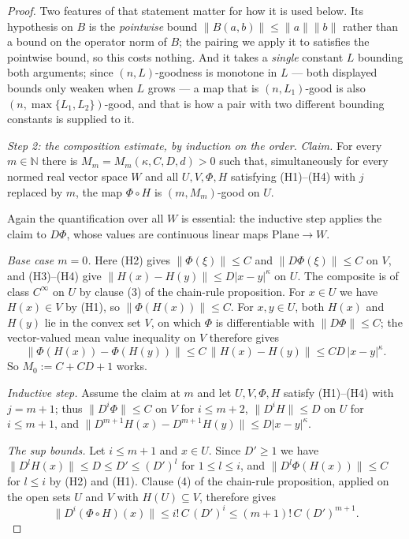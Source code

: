 \begin{proof}
Two features of that statement matter for how it is used below.  Its hypothesis on $B$ is the
\emph{pointwise} bound $\lVert B(a,b)\rVert\le\lVert a\rVert\lVert b\rVert$ rather than a bound
on the operator norm of $B$; the pairing we apply it to satisfies the pointwise bound, so this
costs nothing.  And it takes a \emph{single} constant $L$ bounding both arguments; since
$(n,L)$-goodness is monotone in $L$ --- both displayed bounds only weaken when $L$ grows --- a
map that is $(n,L_1)$-good is also $(n,\max\{L_1,L_2\})$-good, and that is how a pair with two
different bounding constants is supplied to it.

\medskip\noindent\emph{Step 2: the composition estimate, by induction on the order.}
\emph{Claim.}  For every $m\in\mathbb{N}$ there is $M_m=M_m(\kappa,C,D,d)>0$ such that,
simultaneously for every normed real vector space $W$ and all $U,V,\Phi,H$ satisfying
(H1)--(H4) with $j$ replaced by $m$, the map $\Phi\circ H$ is $(m,M_m)$-good on $U$.

Again the quantification over all $W$ is essential: the inductive step applies the claim to
$D\Phi$, whose values are continuous linear maps $\mathrm{Plane}\to W$.

\emph{Base case $m=0$.}  Here (H2) gives $\lVert\Phi(\xi)\rVert\le C$ and
$\lVert D\Phi(\xi)\rVert\le C$ on $V$, and (H3)--(H4) give
$\lVert H(x)-H(y)\rVert\le D\lvert x-y\rvert^{\kappa}$ on $U$.  The composite is of class
$C^{\infty}$ on $U$ by clause (3) of the chain-rule proposition.  For $x\in U$ we have
$H(x)\in V$ by (H1), so $\lVert\Phi(H(x))\rVert\le C$.  For $x,y\in U$, both $H(x)$ and $H(y)$
lie in the convex set $V$, on which $\Phi$ is differentiable with
$\lVert D\Phi\rVert\le C$; the vector-valued mean value inequality on $V$ therefore gives
\[
  \bigl\lVert\Phi(H(x))-\Phi(H(y))\bigr\rVert\le C\,\lVert H(x)-H(y)\rVert
  \le C D\,\lvert x-y\rvert^{\kappa}.
\]
So $M_0:=C+CD+1$ works.

\emph{Inductive step.}  Assume the claim at $m$ and let $U,V,\Phi,H$ satisfy (H1)--(H4) with
$j=m+1$; thus $\lVert D^{i}\Phi\rVert\le C$ on $V$ for $i\le m+2$,
$\lVert D^{i}H\rVert\le D$ on $U$ for $i\le m+1$, and
$\lVert D^{m+1}H(x)-D^{m+1}H(y)\rVert\le D\lvert x-y\rvert^{\kappa}$.

\emph{The sup bounds.}  Let $i\le m+1$ and $x\in U$.  Since $D'\ge1$ we have
$\lVert D^{l}H(x)\rVert\le D\le D'\le (D')^{l}$ for $1\le l\le i$, and
$\lVert D^{l}\Phi(H(x))\rVert\le C$ for $l\le i$ by (H2) and (H1).  Clause (4) of the chain-rule
proposition, applied on the open sets $U$ and $V$ with $H(U)\subseteq V$, therefore gives
\[
  \bigl\lVert D^{i}(\Phi\circ H)(x)\bigr\rVert\le i!\,C\,(D')^{i}
  \le (m+1)!\,C\,(D')^{m+1}.
\]


\end{proof}
